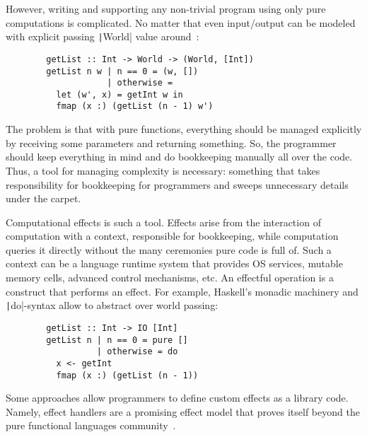 \documentclass[conference]{IEEEtran}
\begin{document}
    However, writing and supporting any non-trivial program using only pure computations is complicated.
    No matter that even input/output can be modeled with explicit passing \texttt|World| value around~\cite{peyton1993imperative}:

    \begin{verbatim}
        getList :: Int -> World -> (World, [Int])
        getList n w | n == 0 = (w, [])
                    | otherwise =
          let (w', x) = getInt w in
          fmap (x :) (getList (n - 1) w')
    \end{verbatim}

    The problem is that with pure functions, everything should be managed explicitly by receiving some parameters and returning something.
    So, the programmer should keep everything in mind and do bookkeeping manually all over the code.
    Thus, a tool for managing complexity is necessary: something that takes responsibility for bookkeeping for programmers and sweeps unnecessary details under the carpet.

    Computational effects is such a tool.
    Effects arise from the interaction of computation with a context, responsible for bookkeeping, while computation queries it directly without the many ceremonies pure code is full of.
    Such a context can be a language runtime system that provides OS services, mutable memory cells, advanced control mechanisms, etc.
    An effectful operation is a construct that performs an effect.
    For example, Haskell's monadic machinery and \texttt|do|-syntax allow to abstract over world passing:

    \begin{verbatim}
        getList :: Int -> IO [Int]
        getList n | n == 0 = pure []
                  | otherwise = do
          x <- getInt
          fmap (x :) (getList (n - 1))
    \end{verbatim}

    Some approaches allow programmers to define custom effects as a library code.
    Namely, effect handlers are a promising effect model that proves itself beyond the pure functional languages community~\cite{plotkin2013handling, chandrasekaran2018algebraic}.

%
\end{document}
